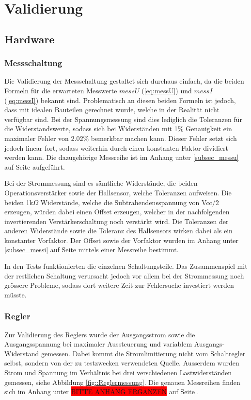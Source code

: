 \section{Validierung}

\subsection{Hardware}

\subsubsection{Messschaltung}
Die Validierung der Messschaltung gestaltet sich durchaus einfach, da die beiden Formeln für die erwarteten Messwerte $messU$ (\ref{eq:messU}) und $messI$ (\ref{eq:messI}) bekannt sind. Problematisch an diesen beiden Formeln ist jedoch, dass mit idealen Bauteilen gerechnet wurde, welche in der Realität nicht verfügbar sind. Bei der Spannungsmessung sind dies lediglich die Toleranzen für die Widerstandswerte, sodass sich bei Widerständen mit 1\% Genauigkeit ein maximaler Fehler von 2.02\% bemerkbar machen kann. Dieser Fehler setzt sich jedoch linear fort, sodass weiterhin durch einen konstanten Faktor dividiert werden kann. Die dazugehörige Messreihe ist im Anhang unter \ref{subsec_messu} auf Seite \pageref{subsec_messu} aufgeführt.

Bei der Strommessung sind es sämtliche Widerstände, die beiden Operationsverstärker sowie der Hallsensor, welche Toleranzen aufweisen. Die beiden 1k$\Omega$ Widerstände, welche die Subtrahendensspannung von Vcc/2 erzeugen, würden dabei einen Offset erzeugen, welcher in der nachfolgenden invertierenden Verstärkerschaltung noch verstärkt wird. Die Toleranzen der anderen Widerstände sowie die Toleranz des Hallsensors wirken dabei als ein konstanter Vorfaktor. Der Offset sowie der Vorfaktor wurden im Anhang unter \ref{subsec_messi} auf Seite \pageref{subsec_messi} mittels einer Messreihe bestimmt.

In den Tests funktionierten die einzelnen Schaltungsteile. Das Zusammenspiel mit der restlichen Schaltung verursacht jedoch vor allem bei der Strommessung noch grössere Probleme, sodass dort weitere Zeit zur Fehlersuche investiert werden müsste.

\subsubsection{Regler}\label{subsec:ValRegler}

Zur Validierung des Reglers wurde der Ausgangsstrom sowie die Ausgangsspannung bei maximaler Aussteuerung und variablem Ausgangs-Widerstand gemessen. Dabei kommt die Stromlimitierung nicht vom Schaltregler selbst, sondern von der zu testzwecken verwendeten Quelle. Ausserdem wurden Strom und Spannung im Verhältnis bei drei verschiedenen Lastwiderständen gemessen, siehe Abbildung \ref{fig::Reglermessung}. Die genauen Messreihen finden sich im Anhang unter \colorbox{red}{BITTE ANHANG ERGÄNZEN} auf Seite .

